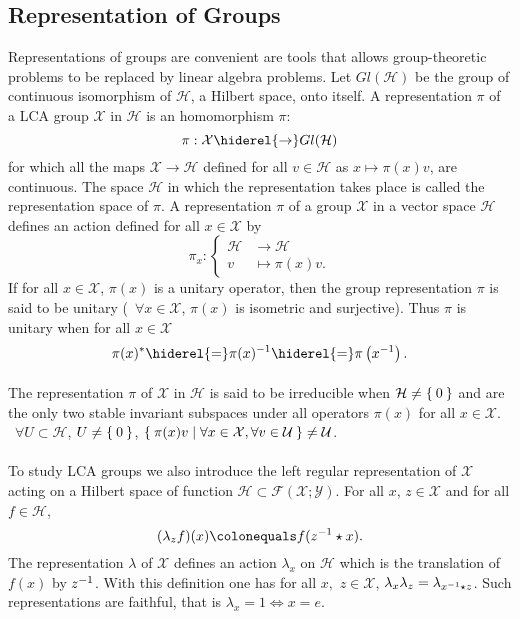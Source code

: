 \subsection{Representation of Groups}
Representations of groups are convenient are tools that allows group-theoretic problems to be replaced by linear algebra problems. Let $Gl(\mathcal{H})$ be the group of continuous isomorphism of $\mathcal{H}$, a Hilbert space, onto itself. A representation $\pi$ of a \acs{LCA} group $\mathcal{X}$ in $\mathcal{H}$ is an homomorphism $\pi$:
\begin{dmath*}
\pi:\mathcal{X}\hiderel{\to} Gl(\mathcal{H})
\end{dmath*}
for which all the maps $\mathcal{X}\to\mathcal{H}$ defined for all $v\in\mathcal{H}$ as $x\mapsto \pi(x)v$, are continuous. The space $\mathcal{H}$ in which the representation takes place
is called the representation space of $\pi$. A representation $\pi$ of a group $\mathcal{X}$ in a vector space $\mathcal{H}$ defines an action defined for all $x\in\mathcal{X}$ by
\begin{dmath*}
\pi_x:\begin{cases}
\mathcal{H}&\to\mathcal{H} \\
v &\mapsto \pi(x)v.
\end{cases}
\end{dmath*}
If for all $x\in\mathcal{X}$, $\pi(x)$ is a unitary operator, then the group representation $\pi$ is said to be unitary (\ie~$\forall x\in\mathcal{X}$, $\pi(x)$ is isometric and surjective). Thus $\pi$ is unitary when for all $x\in\mathcal{X}$
\begin{dmath*}
\pi(x)^*\hiderel{=}\pi(x)^{-1}\hiderel{=}\pi\left(x^{-1}\right).
\end{dmath*}
\paragraph{}
The representation $\pi$ of $\mathcal{X}$ in $\mathcal{H}$ is said to be irreducible when $\mathcal{H}\neq \Set{0}$ and are the only two stable invariant subspaces under all operators $\pi(x)$ for all $x\in\mathcal{X}$. \Ie~$\forall U\subset\mathcal{H}$, $U\neq \Set{0}$, $\Set{\pi(x)v|\forall x\in\mathcal{X},\forall v\in\mathcal{U}}\neq \mathcal{U}$.
\paragraph{}
To study \acs{LCA} groups we also introduce the left regular representation of $\mathcal{X}$ acting on a Hilbert space of function $\mathcal{H}\subset\mathcal{F}(\mathcal{X};\mathcal{Y})$. For all $x$, $z\in\mathcal{X}$ and for all $f\in\mathcal{H}$,
\begin{dmath*}
(\lambda_z f)(x)\colonequals f(\inv{z}\groupop x).
\end{dmath*}
The representation $\lambda$ of $\mathcal{X}$ defines an action $\lambda_x$ on $\mathcal{H}$ which is the translation of $f(x)$ by ${z}^{-1}$. With this definition one has for all $x,$ $z\in\mathcal{X}$, $\lambda_x\lambda_z=\lambda_{{x}^{-1}\star z}$. Such representations are faithful, that is $\lambda_x=1 \iff x=e$.

